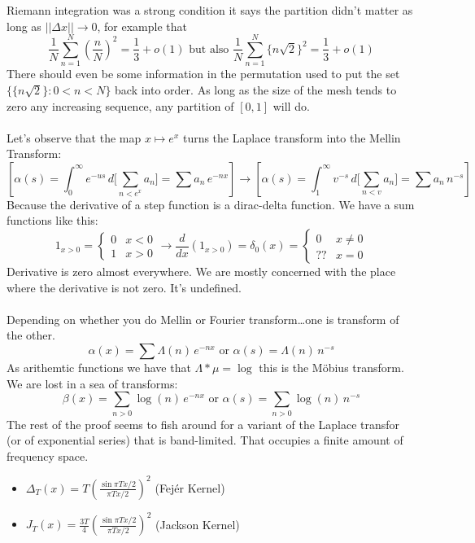 \documentclass[12pt]{article}
\begin{document}
Riemann integration was a strong condition it says the partition didn't matter as long as $||\Delta x|| \to 0$, for example that
$$ \frac{1}{N} \sum_{n=1}^N \left(\frac{n}{N}\right)^2 = \frac{1}{3}  + o(1) \text{ but also } \frac{1}{N} \sum_{n=1}^N \{ n \sqrt{2} \}^2 = \frac{1}{3}  + o(1)$$
There should even be some information in the permutation used to put the set $ \{ \{ n \sqrt{2}\} : 0 < n < N \}$ back into order.  As long as the size of the mesh tends to zero any increasing sequence, any partition of $[0,1]$ will do. \\ \\
Let's observe that the map $x \mapsto e^x$ turns the Laplace transform into the Mellin Transform:
$$ \left[ \alpha(s) = \int_0^\infty e^{-us} \, d\Big[\sum_{n < e^x} a_n \Big] =  \sum a_n \, e^{-nx}\right] \to \left[ \alpha(s) = \int_1^\infty v^{-s} \, d\Big[\sum_{n < v} a_n \Big] = \sum a_n \, n^{-s}\right] $$
Because the derivative of a step function is a dirac-delta function.  We have a sum functions like this:
$$ 1_{x > 0} = \left\{ 
\begin{array}{cc} 0 & x < 0 \\ 
1 & x > 0\end{array}\right. \to \frac{d}{dx} (1_{x > 0}) = \delta_0(x)
= \left\{ 
\begin{array}{cc} 0 & x \neq 0 \\ 
?? & x = 0\end{array}\right.$$
Derivative is zero almost everywhere.  We are mostly concerned with the place where the derivative is not zero.  It's undefined. \\ \\
Depending on whether you do Mellin or Fourier transform\dots one is transform of the other. 
$$ \alpha(x) = \sum \Lambda(n) \, e^{-nx} \text{ or } \alpha(s) = \Lambda(n) \, n^{-s} $$
As arithemtic functions we have that $\Lambda * \mu = \log $ this is the M\"{o}bius transform.  We are lost in a sea of transforms:
$$ \beta(x) = \sum_{n > 0}  \log (n)\, e^{-nx} \text{ or } \alpha(s) = \sum_{n > 0}\log(n) \, n^{-s} $$
The rest of the proof seems to fish around for a variant of the Laplace transfor (or of exponential series) that is band-limited.  That occupies a finite amount of frequency space.
\begin{itemize}
\item $\displaystyle \Delta_T(x) = T \left( \frac{\sin \pi T x /2}{\pi T x / 2} \right)^2 $ (Fej\'{e}r Kernel)
\item $\displaystyle J_T(x) = \frac{3T}{4} \left( \frac{\sin \pi T x /2}{\pi T x / 2} \right)^2 $ (Jackson Kernel)
\end{itemize}
\end{document}
